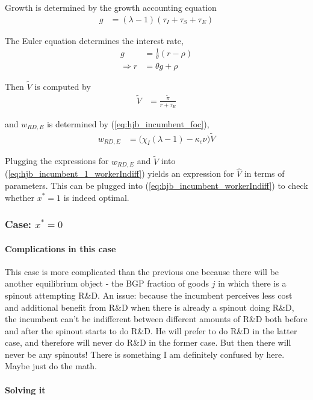 \documentclass[12pt,english]{article}
\theoremstyle{remark}
\begin{document}
Growth is determined by the growth accounting equation
\begin{align}
g &= (\lambda - 1)(\tau_I + \tau_S + \tau_E) \label{eq:growth_accounting}
\end{align}

The Euler equation determines the interest rate, 
\begin{align}
	g &= \frac{1}{\theta} (r - \rho) \label{eq:euler} \\
	\Rightarrow r &= \theta g + \rho \nonumber
\end{align}

Then $\tilde{V}$ is computed by 
\begin{align*}
	\tilde{V} &= \frac{\tilde{\pi}}{r + \tau_E}
\end{align*}

and $w_{RD,E}$ is determined by (\ref{eq:hjb_incumbent_foc}), 
\begin{align*}
	w_{RD,E} &= \big( \chi_I (\lambda - 1) - \kappa_c \nu  \big) \tilde{V}
\end{align*}

Plugging the expressions for $w_{RD,E}$ and $\tilde{V}$ into (\ref{eq:hjb_incumbent_1_workerIndiff}) yields an expression for $\hat{V}$ in terms of parameters. This can be plugged into (\ref{eq:hjb_incumbent_workerIndiff}) to check whether $x^* = 1$ is indeed optimal.

\subsubsection{Case: $x^* = 0$}

\paragraph{Complications in this case}

This case is more complicated than the previous one because there will be another equilibrium object - the BGP fraction of goods $j$ in which there is a spinout attempting R\&D. An issue: because the incumbent perceives less cost and additional benefit from R\&D when there is already a spinout doing R\&D, the incumbent can't be indifferent between different amounts of R\&D both before and after the spinout starts to do R\&D. He will prefer to do R\&D in the latter case, and therefore will never do R\&D in the former case. But then there will never be any spinouts! There is something I am definitely confused by here. Maybe just do the math.

\paragraph{Solving it}
\end{document}

